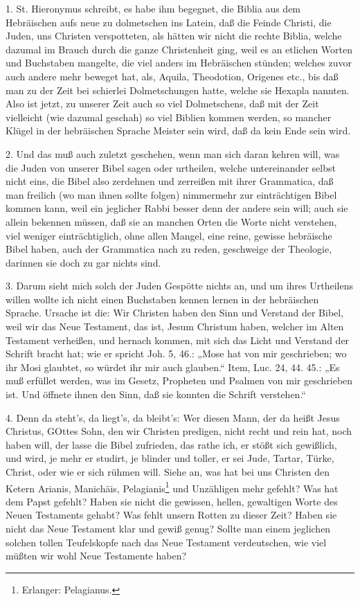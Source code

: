 1. St. Hieronymus schreibt, es habe ihm begegnet, die Biblia aus dem Hebräischen aufs neue zu dolmetschen ins Latein, daß die Feinde Christi, die Juden, uns Christen verspotteten, als hätten wir nicht die rechte Biblia, welche dazumal im Brauch durch die ganze Christenheit ging, weil es an etlichen Worten und Buchstaben mangelte, die viel anders im Hebräischen stünden; welches
zuvor auch andere mehr beweget hat, als, Aquila, Theodotion, Origenes etc., bis daß man zu der Zeit bei schierlei Dolmetschungen hatte, welche sie Hexapla nannten. Also ist jetzt, zu unserer Zeit auch so viel Dolmetschens, daß mit der Zeit vielleicht (wie dazumal geschah) so viel Biblien kommen werden, so mancher Klügel in der hebräischen Sprache Meister sein wird, daß da kein Ende sein wird.

2. Und das muß auch zuletzt geschehen, wenn man sich daran kehren will, was die Juden von unserer Bibel sagen oder urtheilen, welche untereinander selbst nicht eins, die Bibel also zerdehnen und zerreißen mit ihrer Grammatica, daß man freilich (wo man ihnen sollte folgen) nimmermehr zur einträchtigen Bibel kommen kann, weil ein jeglicher Rabbi besser denn der andere sein will; auch sie allein bekennen müssen, daß sie an manchen Orten die Worte nicht verstehen, viel weniger einträchtiglich, ohne allen Mangel, eine reine, gewisse hebräische Bibel haben, auch der Grammatica nach zu reden, geschweige der Theologie, darinnen sie doch zu gar nichts sind.

3. Darum sieht mich solch der Juden Gespötte nichts an, und um ihres Urtheilens willen wollte ich nicht einen Buchstaben kennen lernen in der hebräischen Sprache. Ursache ist die: Wir Christen haben den Sinn und Verstand der Bibel, weil wir das Neue Testament, das ist, Jesum Christum haben, welcher im Alten Testament verheißen, und hernach kommen, mit sich das Licht und Verstand der Schrift bracht hat; wie er spricht Joh. 5, 46.: „Mose hat von mir geschrieben; wo ihr Mosi glaubtet, so würdet ihr mir auch glauben.“ Item, Luc. 24, 44. 45.: „Es muß erfüllet werden, was im Gesetz, Propheten und Psalmen von mir geschrieben ist. Und öffnete ihnen den Sinn, daß sie konnten die Schrift verstehen.“

4. Denn da steht’s, da liegt’s, da bleibt’s: Wer diesen Mann, der da heißt Jesus Christus, GOttes Sohn, den wir Christen predigen, nicht recht und rein hat, noch haben will, der lasse die Bibel zufrieden, das rathe ich, er stößt sich gewißlich, und wird, je mehr er studirt, je blinder und toller, er sei Jude, Tartar, Türke, Christ, oder wie er sich rühmen will. Siehe an, was hat bei uns Christen den Ketern Arianis, Manichäis, Pelagianis\footnote{Erlanger: Pelagianus.} und Unzähligen mehr gefehlt? Was hat dem Papst gefehlt? Haben sie nicht die gewissen, hellen, gewaltigen Worte des Neuen Testaments gehabt? Was fehlt unsern Rotten zu dieser Zeit? Haben sie nicht das Neue Testament klar und gewiß genug? Sollte man einem jeglichen solchen tollen Teufelskopfe nach das Neue Testament verdeutschen, wie viel müßten wir wohl Neue Testamente haben?


